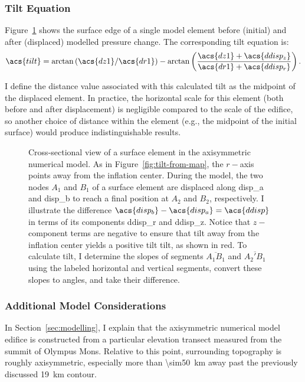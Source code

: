 \subsubsection{Tilt Equation}
Figure~\ref{fig:tilt-from-model} shows the surface edge of a single model element before (initial) and after (displaced) modelled pressure change. The corresponding tilt equation is:
\begin{equation}
    \acs{tilt} = \arctan\left({\acs{dz1}}/{\acs{dr1}}\right) - \arctan\left(\dfrac{\acs{dz1}+\acs{ddisp_z}}{\acs{dr1}+\acs{ddisp_r}}\right).\label{eq:tilt-from-model}
\end{equation}

I define the distance value associated with this calculated tilt as the midpoint of the displaced element. In practice, the horizontal scale for this element (both before and after displacement) is negligible compared to the scale of the edifice, so another choice of distance within the element (e.g., the midpoint of the initial surface) would produce indistinguishable results.

\begin{figure}
    \caption[Tilt from numerical modelling]{Cross-sectional view of a surface element in the axisymmetric numerical model. As in Figure~\ref{fig:tilt-from-map}, the $r-$axis points away from the inflation center. During the model, the two nodes $A_1$ and $B_1$ of a surface element are displaced along \acs{disp_a} and \acs{disp_b} to reach a final position at $A_2$ and $B_2$, respectively. I illustrate the difference $\acs{disp_b} - \acs{disp_a} = \acs{ddisp}$ in terms of its components \acs{ddisp_r} and \acs{ddisp_z}. Notice that $z-$component terms are negative to ensure that tilt away from the inflation center yields a positive tilt \acs{tilt}, as shown in red. To calculate \acs{tilt}, I determine the slopes of segments $\overline{A_1B_1}$ and $\overline{A_2'B_1}$ using the labeled horizontal and vertical segments, convert these slopes to angles, and take their difference.}%
    \label{fig:tilt-from-model}%
\end{figure}

\subsubsection{Additional Model Considerations}

In Section~\ref{sec:modelling}, I explain that the axisymmetric numerical model edifice is constructed from a particular elevation transect measured from the summit of Olympus Mons. Relative to this point, surrounding topography is roughly axisymmetric, especially more than \qty{\sim50}{\km} away past the previously discussed \qty{19}{\km} contour.

